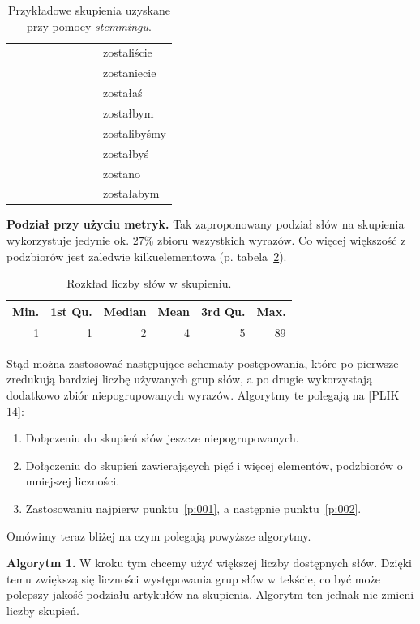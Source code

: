 \documentclass{praca1}
\begin{document}
\begin{table}[!h]
\begin{tabular}{|lllllllll|}
   &  &  &  &  &  &  &  & zostaliście \\ 
   &  &  &  &  &  &  &  & zostaniecie \\ 
   &  &  &  &  &  &  &  & zostałaś \\ 
   &  &  &  &  &  &  &  & zostałbym \\ 
   &  &  &  &  &  &  &  & zostalibyśmy \\ 
   &  &  &  &  &  &  &  & zostałbyś \\ 
   &  &  &  &  &  &  &  & zostano \\ 
   &  &  &  &  &  &  &  & zostałabym \\ \hline
\end{tabular}
\caption{Przykładowe skupienia uzyskane przy pomocy \emph{stemmingu}.}
\label{tab:003}
\end{table}

\textbf{Podział przy użyciu metryk.}
Tak zaproponowany podział słów na skupienia wykorzystuje jedynie ok. $27\%$ zbioru wszystkich wyrazów. Co więcej większość z podzbiorów jest zaledwie kilkuelementowa (p. tabela~\ref{tab:004}). 

\begin{table}[!h]
\centering
\begin{tabular}{|r|r|r|r|r|r|}
  \hline
Min. & 1st Qu. & Median & Mean & 3rd Qu. & Max. \\ 
  \hline
1 & 1 & 2 & 4 & 5 & 89 \\ 
   \hline
\end{tabular}
\caption{Rozkład liczby słów w skupieniu.}
\label{tab:004}
\end{table}


Stąd można zastosować następujące schematy postępowania, które po pierwsze zredukują bardziej liczbę używanych grup słów, a po drugie wykorzystają dodatkowo zbiór niepogrupowanych wyrazów. Algorytmy te polegają na [PLIK 14]:
\begin{enumerate}
\item\label{p:001} Dołączeniu do skupień słów jeszcze niepogrupowanych.
\item\label{p:002} Dołączeniu do skupień zawierających pięć i więcej elementów, podzbiorów o mniejszej liczności.
\item Zastosowaniu najpierw punktu~\ref{p:001}, a następnie punktu~\ref{p:002}.
\end{enumerate}

Omówimy teraz bliżej na czym polegają powyższe algorytmy.

\textbf{Algorytm 1.} W kroku tym chcemy użyć większej liczby dostępnych słów. Dzięki temu zwiększą się liczności występowania grup słów w tekście, co być może polepszy jakość podziału artykułów na skupienia. Algorytm ten jednak nie zmieni liczby skupień. 
\end{document}
